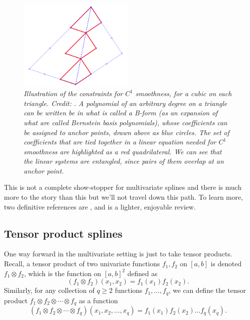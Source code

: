 \documentclass{article}
\begin{document}
\begin{figure}[tb]
\centering
\includegraphics[width=0.5\textwidth]{c1_cubic.png}
\caption{\it Illustration of the constraints for $C^1$ smoothness, for a cubic
  on each triangle. Credit: \citet{deboor2009way}. A polynomial of an arbitrary
  degree on a triangle can be written be in what is called a B-form (as an
  expansion of what are called Bernstein basis polynomials), whose coefficients
  can be assigned to anchor points, drawn above as blue circles. The set of
  coefficients that are tied together in a linear equation needed for $C^1$
  smoothness are highlighted as a red quadrilateral. We can see that the linear
  systems are entangled, since pairs of them overlap at an anchor point.}     
\label{fig:c1_constraints}
\end{figure}

This is not a complete show-stopper for multivariate splines and there is much
more to the story than this but we'll not travel down this path. To learn more,
two definitive references are \citet{deboor1993box, lai2007spline}, and
\citet{deboor2009way} is a lighter, enjoyable review.    

\subsection{Tensor product splines}

One way forward in the multivariate setting is just to take tensor
products. Recall, a tensor product of two univariate functions $f_1,f_2$ on
$[a,b]$ is denoted $f_1 \otimes f_2$, which is the function on $[a,b]^2$ defined
as  
\[
(f_1 \otimes f_2)(x_1, x_2) = f_1(x_1) f_2(x_2). 
\]
Similarly, for any collection of $q \geq 2$ functions $f_1,\dots,f_q$, we can
define the tensor product $f_1 \otimes f_2 \otimes \cdots \otimes f_q$ as a
function 
\[
(f_1 \otimes f_2 \otimes \cdots \otimes f_q)(x_1, x_2, \dots, x_q) = f_1(x_1) 
f_2(x_2) \dots f_q(x_q).
\]
\end{document}
